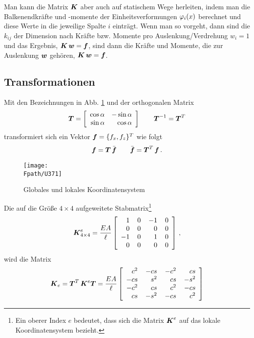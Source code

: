 Man kann die Matrix $\vek K$ aber auch auf statischem Wege herleiten, indem man die  Balkenendkr\"{a}fte und -momente der Einheitsverformungen $\Np_i(x)$ berechnet und diese Werte in die jeweilige Spalte $i$ eintr\"{a}gt. Wenn man so vorgeht, dann sind die $k_{ij}$ der Dimension nach Kr\"{a}fte  bzw. Momente pro Auslenkung/Verdrehung $w_i = 1$ und das Ergebnis, $\vek K\,\vek w = \vek f$, sind dann die Kr\"{a}fte und Momente, die zur Auslenkung $\vek w$ geh\"{o}ren, $\vek K\,\vek w = \vek f$.

\textcolor{sectionTitleBlue}{\subsection{Transformationen}}
Mit den Bezeichnungen in Abb. \ref{U371} und der orthogonalen Matrix
\begin{align}
\vek T = \left[\barr{r r } \cos \alpha & - \sin \alpha \\ \sin \alpha  & \cos \alpha\earr\right] \qquad \vek T^{-1} = \vek T^T
\end{align}
transformiert sich ein Vektor $\vek f = \{f_x, f_z\}^T$ wie folgt
\begin{align}
\vek f = \vek T\,\bar{\vek f} \qquad  \bar{\vek f} = \vek T^T\,\vek f\,.
\end{align}
\begin{figure}[tbp]
\centering
\if {} \sidecaption \fi
\texttt{[image: \\Fpath/U371]}
\caption{ Globales und lokales Koordinatensystem} \label{U371}
\end{figure}%
Die auf die Gr\"{o}{\ss}e $4 \times 4$ aufgeweitete Stabmatrix\footnote{Ein oberer Index $e$ bedeutet, dass sich die Matrix $\vek K^e$ auf das lokale Koordinatensystem bezieht.}
\begin{align}
\vek K_{4 \times 4}^e = \frac{EA}{\ell} \left[\barr{r @{\hspace{4mm}}r @{\hspace{4mm}}r @{\hspace{4mm}}r} 1 & 0 & -1 & 0 \\  0 & 0 & 0 & 0\\ -1 & 0 & 1 &0 \\ 0 & 0 & 0 &0\earr\right]\,,
\end{align}
wird die Matrix
\begin{align}
\vek K_e = \vek T^T\,\vek K^e \vek T = \frac{EA}{\ell }
 \left[\barr{r @{\hspace{4mm}}r @{\hspace{4mm}}r @{\hspace{4mm}}r} c^2 & - cs & -c^2 & cs \\ - cs & s^2 & cs & -s^2\\ -c^2 & cs & c^2 &-cs \\ cs & -s^2 & -cs &c^2\earr\right]
\end{align}
